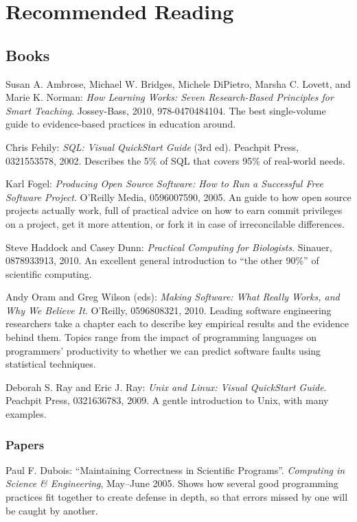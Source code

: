 \chapter{Recommended Reading}\label{s:bib}

\section{Books}

Susan A. Ambrose, Michael W. Bridges, Michele DiPietro, Marsha C.
Lovett, and Marie K. Norman:
\emph{How Learning Works: Seven Research-Based Principles for Smart Teaching}.
Jossey-Bass, 2010, 978-0470484104.
The best single-volume guide to evidence-based practices in education
around.

Chris Fehily: \emph{SQL: Visual QuickStart Guide} (3rd ed).
Peachpit Press, 0321553578, 2002.
Describes the 5\% of SQL that covers 95\% of real-world needs.

Karl Fogel: \emph{Producing Open Source Software: How to Run a
Successful Free Software Project}. O'Reilly Media, 0596007590, 2005.
An guide to how open source projects actually work, full of practical
advice on how to earn commit privileges on a project, get it more
attention, or fork it in case of irreconcilable differences.

Steve Haddock and Casey Dunn: \emph{Practical Computing for
Biologists}. Sinauer, 0878933913, 2010.
An excellent general introduction to ``the other 90\%'' of scientific
computing.

Andy Oram and Greg Wilson (eds): \emph{Making Software: What
Really Works, and Why We Believe It}. O'Reilly, 0596808321, 2010.
Leading software engineering researchers take a chapter each to describe
key empirical results and the evidence behind them. Topics range from
the impact of programming languages on programmers' productivity to
whether we can predict software faults using statistical techniques.

Deborah S. Ray and Eric J. Ray: \emph{Unix and Linux: Visual
QuickStart Guide}. Peachpit Press, 0321636783, 2009.
A gentle introduction to Unix, with many examples.

\subsection{Papers}

Paul F. Dubois: ``Maintaining Correctness in Scientific
Programs''. \emph{Computing in Science \& Engineering}, May--June 2005.
Shows how several good programming practices fit together to create
defense in depth, so that errors missed by one will be caught by
another.

